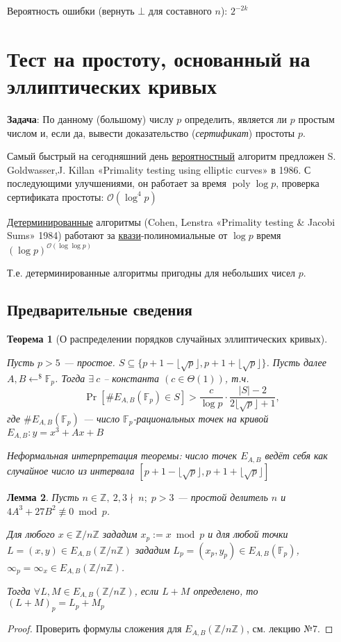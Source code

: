 \documentclass[12pt]{article}
\newcommand{\Z}{{{\mathbb Z}}}
\newcommand{\F}{{{\mathbb F}}}
\newcommand{\bigO}{\mathcal{O}}
\newtheorem{theorem}{Теорема}
\newtheorem{lemma}[theorem]{Лемма}
\theoremstyle{definition}
\theoremstyle{definition}
\theoremstyle{definition}
\begin{document}
Вероятность ошибки (вернуть $\bot$ для составного $n$): $2^{-2k}$


\section{Тест на простоту, основанный на эллиптических кривых}

\textbf{Задача}: По данному (большому) числу $p$ определить, является ли $p$ простым числом и, если да, вывести доказательство (\textit{сертификат}) простоты $p$. 

Самый быстрый на сегодняшний день \underline{вероятностный} алгоритм предложен S. Goldwasser,J. Killan «Primality testing using elliptic curves» в 1986. С последующими улучшениями, он работает за время $\operatorname{poly}\log p$, проверка сертификата простоты: $\bigO(\log^4 p)$

\underline{Детерминированные} алгоритмы (Cohen, Lenstra «Primality testing \& Jacobi Sums» 1984) работают за \underline{квази}-полиномиальные от $\log p$ время $(\log p)^{\bigO(\log\log p)}$

Т.е. детерминированные алгоритмы пригодны для небольших чисел $p$.

\subsection{Предварительные сведения}

\begin{theorem}[О распределении порядков случайных эллиптических кривых]
\label{t1}

Пусть $p>5$ — простое. $S \subseteq \{ p+1-\lfloor\sqrt{p}\rfloor, p+1+\lfloor\sqrt{p}\rfloor \}$.
Пусть далее $A, B \leftarrow^{\$} \F_p$. Тогда $\exists\ c$ -- константа $(c \in \Theta(1))$, т.ч.
\[
    \Pr\left[\#E_{A,B}(\F_p) \in S \right] > \frac{c}{\log p} \cdot \frac{|S|-2}{2\lfloor\sqrt{p}\rfloor + 1},
\]
где $\#E_{A,B}(\F_p)$ — число $\F_p$-рациональных точек на кривой $E_{A,B}: y = x^3 + Ax+B$

Неформальная интерпретация теоремы: число точек $E_{A,B}$ ведёт себя как случайное число из интервала $\left[p+1-\lfloor\sqrt{p}\rfloor, p+1+\lfloor\sqrt{p}\rfloor \right]$
\end{theorem}

\begin{lemma}
\label{l2}
    Пусть $n \in \Z,\ 2,3\nmid \ n;\; p>3$ — простой делитель $n$ и $4A^3 + 27B^2 \not\equiv 0\bmod p$.
    
    Для любого $x \in \Z/n\Z$ зададим $x_p := x\bmod p$ и  для любой точки $L = (x,y) \in E_{A,B}( \Z/n\Z)$ зададим $L_p = (x_p, y_p) \in E_{A,B}(\F_p)$,  $\infty_p = \infty_x \in E_{A, B}(\Z/n\Z)$. 
    
    Тогда $\forall L, M \in E_{A,B}(\Z/n\Z)$, если $L+M$ определено, то $(L+M)_p = L_p+M_p$
\end{lemma}
\begin{proof}
    Проверить формулы сложения для $E_{A,B}(\Z/n\Z)$, см. лекцию №7.
\end{proof}
\end{document}
